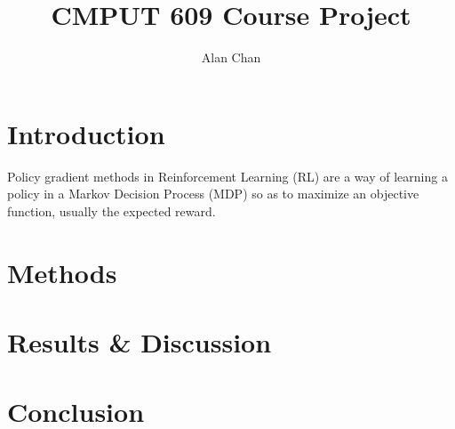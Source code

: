 \documentclass{article}
\title{CMPUT 609 Course Project}
\author{Alan Chan}
\date{}
\begin{document}
  \maketitle

  \section{Introduction}
  Policy gradient methods in Reinforcement Learning (RL) are a way of learning a policy in a Markov Decision Process (MDP) so as to maximize an objective function, usually the expected reward.

  \section{Methods}
  

  \section{Results & Discussion}

  \section{Conclusion}
\end{document}
